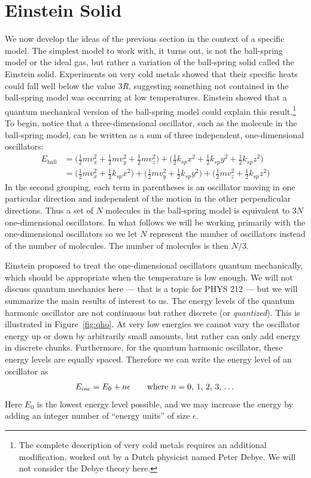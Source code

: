 \section{Einstein Solid}

We now develop the ideas of the previous section in the context of a
specific model.  The simplest model to work with, it turns out, is not
the ball-spring model or the ideal gas, but rather a variation of the
ball-spring solid called the Einstein solid.  Experiments on very cold
metals showed that their specific heats could fall well below the
value $3R$, suggesting something not contained in the ball-spring
model was occurring at low temperatures.  Einstein showed that a
quantum mechanical version of the ball-spring model could explain this
result.\footnote{The complete description of very cold metals requires
  an additional modification, worked out by a Dutch physicist named
  Peter Debye.  We will not consider the Debye theory here.}  To
begin, notice that a three-dimensional oscillator, such as the
molecule in the ball-spring model, can be written as a sum of three
independent, one-dimensional oscillators:
\begin{align}
E_\text{ball} &= \bigl(\textstyle\frac{1}{2} m v_x^2 + \frac{1}{2} m v_y^2 
+ \frac{1}{2} m v_z^2\bigr) +
\bigl(\textstyle\frac{1}{2} k_{sp} x^2
+ \frac{1}{2} k_{sp} y^2 + \frac{1}{2} k_{sp}z^2\bigr)
\\
 &= \bigl(\textstyle\frac{1}{2}mv_x^2+
   \frac{1}{2}k_{sp}x^2\bigr)
+\bigl(\textstyle\frac{1}{2}mv_y^2+\frac{1}{2}k_{sp}y^2\bigr)
+\bigl(\textstyle\frac{1}{2}mv_z^2+\frac{1}{2}k_{sp}z^2\bigr)
\end{align}
In the second grouping, each term in parentheses is an oscillator
moving in one particular direction and independent of the motion in
the other perpendicular directions.  Thus a set of $N$ molecules in
the ball-spring model is equivalent to $3N$ one-dimensional
oscillators.  In what follows we will be working primarily with the
one-dimensional oscillators so we let $N$ represent the number of
oscillators instead of the number of molecules.  The number of
molecules is then $N/3$.

Einstein proposed to treat the one-dimensional oscillators quantum
mechanically, which should be appropriate when the temperature is
low enough.  We will not discuss quantum mechanics here --- that is a
topic for PHYS 212 --- but we will summarize the main results of interest
to us.  The energy levels of the quantum harmonic oscillator are not
continuous but rather discrete (or \textit{quantized}).  This is
illustrated in Figure~\ref{fig:qho}.  At very low energies we cannot
vary the oscillator energy up or down by arbitrarily small amounts,
but rather can only add energy in discrete chunks.  Furthermore, for
the quantum harmonic oscillator, these energy levels are equally
spaced.  Therefore we can write the energy level of an oscillator as
\begin{equation}
E_\text{osc} = E_0 + n\epsilon \qquad
\text{where $n=0$, 1, 2, 3, \dots}
\end{equation}
Here $E_0$ is the lowest energy level possible, and we may increase
the energy by adding an integer number of ``energy units'' of size
$\epsilon$. 

